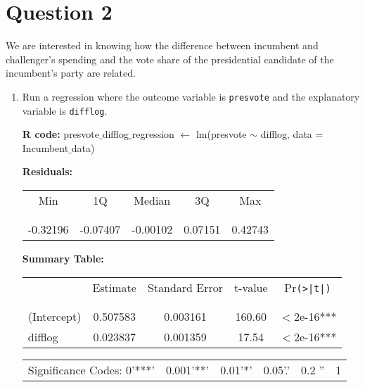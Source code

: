 \documentclass[12pt,letterpaper]{article}
\begin{document}
	\section*{Question 2}
	\noindent We are interested in knowing how the difference between incumbent and challenger's spending and the vote share of the presidential candidate of the incumbent's party are related.	\vspace{.25cm}
	\begin{enumerate}
		\item Run a regression where the outcome variable is \texttt{presvote} and the explanatory variable is \texttt{difflog}.
		
		\-\hspace{0.5cm}\textbf{R code:} presvote$\_$difflog$\_$regression $\gets$ lm(presvote $\sim$ difflog, data = Incumbent$\_$data)
		
		\vspace{0.5cm}
		\begin{table}[h!]
			\-\hspace{0.5cm}\textbf{Residuals:}
			\centering
			\begin{tabular}{c c c c c}
				Min & 1Q & Median & 3Q & Max \\
				\\[-1.8ex] 
				\hline \\[-1.8ex]
				-0.32196 & -0.07407 & -0.00102 & 0.07151 & 0.42743\\
			\end{tabular}
		\end{table}
		\vspace{0.5cm}
		\begin{table}[h!]
			\-\hspace{0.5cm}\textbf{Summary Table:}
			\centering
			\begin{tabular}{l | c c c c }
				& Estimate & Standard Error & t-value & Pr\texttt{(>|t|)} \\
				\\[-1.8ex] 
				\hline \\[-1.8ex]
				(Intercept) & 0.507583 & 0.003161 & 160.60 & $<$2e-16*** \\
				difflog & 0.023837 & 0.001359 & 17.54 & $<$2e-16*** \\
			\end{tabular}
		\end{table}
		\vspace{0.5cm}
		\begin{table}[h!]
			\centering
			\begin{tabular}{c c c c c c}
				\\[-1.8ex] 
				Significance Codes: 0'***' & 0.001'**' & 0.01'*' & 0.05'.' & 0.2 '' & 1 \\
			\end{tabular}
		\end{table}
		

\end{enumerate}
\end{document}
